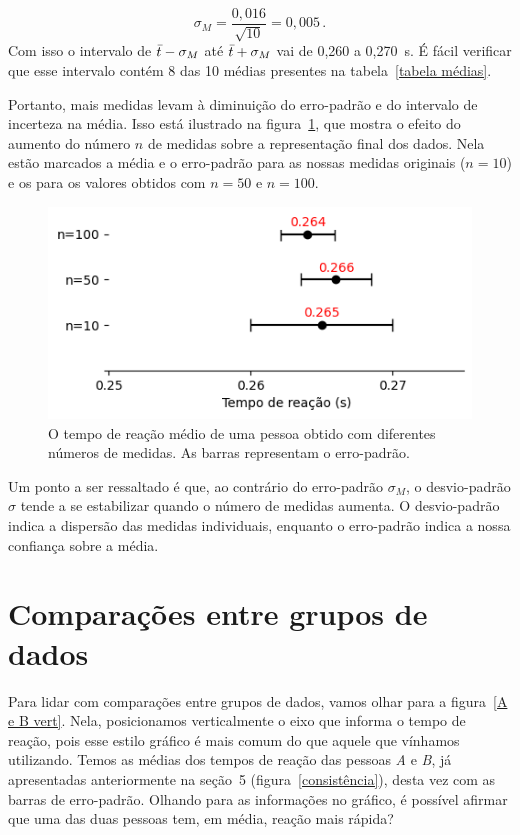 \documentclass[12pt, a4paper]{article}
\begin{document}
\[\sigma_M = \frac{0,016}{\sqrt{10}}=0,005\, .\]
Com isso o intervalo de $\Bar{t}-\sigma_M$ até $\Bar{t}+\sigma_M$ vai de 0,260 a 0,270~s. É fácil verificar que esse intervalo contém 8 das 10 médias presentes na tabela~\ref{tabela médias}. 

Portanto, mais medidas levam à diminuição do erro-padrão e do intervalo de incerteza na média. Isso está ilustrado na figura~\ref{ganho de precisão}, que mostra o efeito do aumento do número $n$ de medidas sobre a representação final dos dados. 
Nela estão marcados a média e o erro-padrão para as nossas medidas originais ($n=10$) e os para os valores obtidos com $n=50$ e $n=100$.  

\begin{figure}[H]
    \centering
    \includegraphics[width=0.7\linewidth]{n - 10, 50, 100.png}
    \caption{O tempo de reação médio de uma pessoa obtido com diferentes números de medidas. As barras representam o erro-padrão.}
    \label{ganho de precisão}
\end{figure}

Um ponto a ser ressaltado é que, ao contrário do erro-padrão $\sigma_M$, o desvio-padrão $\sigma$ tende a se estabilizar quando o número de medidas aumenta. 
O desvio-padrão indica a dispersão das medidas individuais, enquanto o erro-padrão indica a nossa confiança sobre a média.

\section{Comparações entre grupos de dados}

Para lidar com comparações entre grupos de dados, vamos olhar para a figura~\ref{A e B vert}. Nela, posicionamos verticalmente o eixo que informa o tempo de reação, pois esse estilo gráfico é mais comum do que aquele que vínhamos utilizando. Temos as médias dos tempos de reação das pessoas \textit{A} e \textit{B}, já apresentadas anteriormente na seção~5 (figura~\ref{consistência}), desta vez com as barras de erro-padrão. Olhando para as informações no gráfico, é possível afirmar que uma das duas pessoas tem, em média, reação mais rápida?
\end{document}
